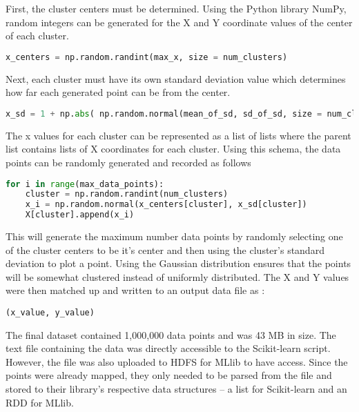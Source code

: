 \documentclass[9pt,twocolumn,twoside]{idsi}
\begin{document}
First, the cluster centers must be determined. Using the Python library NumPy, random integers can be generated for the X and Y coordinate values of the center of each cluster. 
\begin{lstlisting}[language=Python, breaklines=true]
x_centers = np.random.randint(max_x, size = num_clusters)
\end{lstlisting}
Next, each cluster must have its own standard deviation value which determines how far each generated point can be from the center. 
\begin{lstlisting}[language=Python, breaklines=true]
x_sd = 1 + np.abs( np.random.normal(mean_of_sd, sd_of_sd, size = num_clusters) )
\end{lstlisting} 
The x values for each cluster can be represented as a list of lists where the parent list contains lists of X coordinates for each cluster. Using this schema, the data points can be randomly generated and recorded as follows
\begin{lstlisting}[language=Python, breaklines=true]
for i in range(max_data_points):
    cluster = np.random.randint(num_clusters)
    x_i = np.random.normal(x_centers[cluster], x_sd[cluster])
    X[cluster].append(x_i)
\end{lstlisting}
This will generate the maximum number data points by randomly selecting one of the cluster centers to be it's center and then using the cluster's standard deviation to plot a point. Using the Gaussian distribution ensures that the points will be somewhat clustered instead of uniformly distributed. The X and Y values were then matched up and written to an output data file as :
\begin{lstlisting}[frame=none]
(x_value, y_value)
\end{lstlisting}
The final dataset contained 1,000,000 data points and was 43 MB in size. The text file containing the data was directly accessible to the Scikit-learn script. However, the file was also uploaded to HDFS for MLlib to have access. Since the points were already mapped, they only needed to be parsed from the file and stored to their library's respective data structures -- a list for Scikit-learn and an RDD for MLlib.
\end{document}
